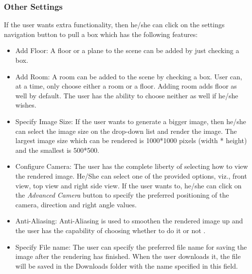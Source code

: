 \documentclass[10pt]{scrartcl}
\begin{document}
\subsubsection{Other Settings}
If the user wants extra functionality, then he/she can click on the settings navigation button to pull a box which has the following features: \par
\begin{itemize}
    \item Add Floor: A floor or a plane to the scene can be added by just checking a box.
    \item Add Room: A room can be added to the scene by checking a box. User can, at a time, only choose either a room or a floor. Adding room adds floor as well by default. The user has the ability to choose neither as well if he/she wishes.
    \item Specify Image Size: If the user wants to generate a bigger image, then he/she can select the image size on the drop-down list and render the image. The largest image size which can be rendered is 1000*1000 pixels (width * height) and the smallest is 500*500.
    \item Configure Camera: The user has the complete liberty of selecting how to view the rendered image. He/She can select one of the provided options, viz., front view, top view and right side view. If the user wants to, he/she can click on the \textit{Advanced Camera} button to specify the preferred positioning of the camera, direction and right angle values.
    \item Anti-Aliasing: Anti-Aliasing is used to smoothen the rendered image up and the user has the capability of choosing whether to do it or not .
    \item Specify File name: The user can specify the preferred file name for saving the image after the rendering has finished. When the user downloads it, the file will be saved in the Downloads folder with the name specified in this field. 
\end{itemize}
\end{document}

